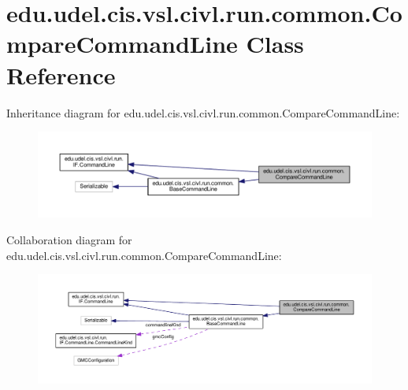 \hypertarget{classedu_1_1udel_1_1cis_1_1vsl_1_1civl_1_1run_1_1common_1_1CompareCommandLine}{}\section{edu.\+udel.\+cis.\+vsl.\+civl.\+run.\+common.\+Compare\+Command\+Line Class Reference}
\label{classedu_1_1udel_1_1cis_1_1vsl_1_1civl_1_1run_1_1common_1_1CompareCommandLine}


Inheritance diagram for edu.\+udel.\+cis.\+vsl.\+civl.\+run.\+common.\+Compare\+Command\+Line\+:
\nopagebreak
\begin{figure}[H]
\begin{center}
\leavevmode
\includegraphics[width=350pt]{classedu_1_1udel_1_1cis_1_1vsl_1_1civl_1_1run_1_1common_1_1CompareCommandLine__inherit__graph}
\end{center}
\end{figure}


Collaboration diagram for edu.\+udel.\+cis.\+vsl.\+civl.\+run.\+common.\+Compare\+Command\+Line\+:
\nopagebreak
\begin{figure}[H]
\begin{center}
\leavevmode
\includegraphics[width=350pt]{classedu_1_1udel_1_1cis_1_1vsl_1_1civl_1_1run_1_1common_1_1CompareCommandLine__coll__graph}
\end{center}
\end{figure}
